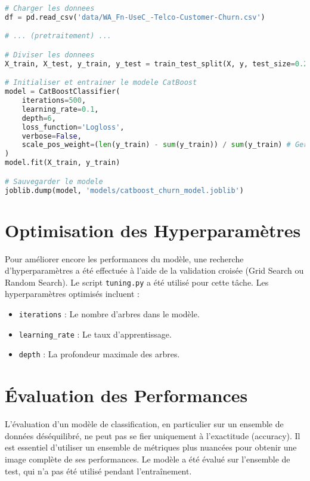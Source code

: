 \begin{lstlisting}[language=Python, caption={Extrait du script d'entraînement (train.py)}]
# Charger les donnees
df = pd.read_csv('data/WA_Fn-UseC_-Telco-Customer-Churn.csv')

# ... (pretraitement) ...

# Diviser les donnees
X_train, X_test, y_train, y_test = train_test_split(X, y, test_size=0.2, random_state=42)

# Initialiser et entrainer le modele CatBoost
model = CatBoostClassifier(
    iterations=500,
    learning_rate=0.1,
    depth=6,
    loss_function='Logloss',
    verbose=False,
    scale_pos_weight=(len(y_train) - sum(y_train)) / sum(y_train) # Gerer le desequilibre
)
model.fit(X_train, y_train)

# Sauvegarder le modele
joblib.dump(model, 'models/catboost_churn_model.joblib')
\end{lstlisting}

\section{Optimisation des Hyperparamètres}
Pour améliorer encore les performances du modèle, une recherche d'hyperparamètres a été effectuée à l'aide de la validation croisée (Grid Search ou Random Search). Le script \texttt{tuning.py} a été utilisé pour cette tâche. Les hyperparamètres optimisés incluent :
\begin{itemize}
    \item \texttt{iterations} : Le nombre d'arbres dans le modèle.
    \item \texttt{learning\_rate} : Le taux d'apprentissage.
    \item \texttt{depth} : La profondeur maximale des arbres.
\end{itemize}

\section{Évaluation des Performances}
L'évaluation d'un modèle de classification, en particulier sur un ensemble de données déséquilibré, ne peut pas se fier uniquement à l'exactitude (accuracy). Il est essentiel d'utiliser un ensemble de métriques plus nuancées pour obtenir une image complète de ses performances. Le modèle a été évalué sur l'ensemble de test, qui n'a pas été utilisé pendant l'entraînement.

